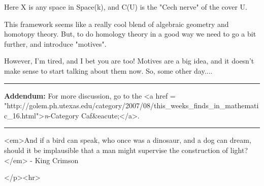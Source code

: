 Here X is any space in Space(k), and C(U) is the "Cech nerve"
of the cover U.

This framework seems like a really cool blend of algebraic 
geometry and homotopy theory.  But, to do homology theory
in a good way we need to go a bit further, and introduce "motives".

However, I'm tired, and I bet you are too!  Motives are a big
idea, and it doesn't make sense to start talking about them now.
So, some other day....

\par\noindent\rule{\textwidth}{0.4pt}
\textbf{Addendum:} 
For more discussion, go to the
<a href = "http://golem.ph.utexas.edu/category/2007/08/this_weeks_finds_in_mathematic_16.html">\emph{n}-Category Caf&eacute;</a>.


\par\noindent\rule{\textwidth}{0.4pt}
<em>And if a bird can speak, who once was a dinosaur, and a dog
can dream, should it be implausible that a man might supervise the
construction of light?</em> - King Crimson

</p><hr>



